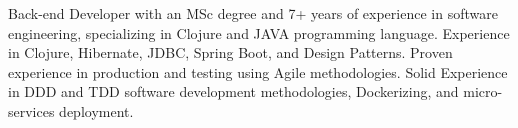 \par{
Back-end Developer with an MSc degree and 7+ years of experience in software engineering, specializing in Clojure and JAVA programming language. Experience in Clojure, Hibernate, JDBC, Spring Boot, and Design Patterns. Proven experience in production and testing using Agile methodologies. Solid Experience in DDD and TDD software development methodologies, Dockerizing, and micro-services deployment.
}

